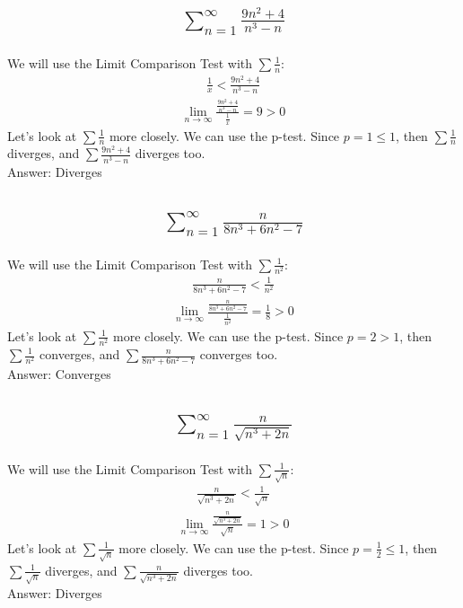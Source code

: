 \documentclass{article}
\begin{document}
\subsection{
	\begin{align*}
		\sum_{n = 1}^\infty \frac{9n^2 + 4}{n^3 - n}
	\end{align*}
}
We will use the Limit Comparison Test with $\sum \frac{1}{n}$:
\begin{align*}
	\frac{1}{x} < \frac{9n^2 + 4}{n^3 - n}
\end{align*}
\begin{align*}
	\lim_{n \to \infty} {\frac{\frac{9n^2 + 4}{n^3 - n}}{\frac{1}{x}}} = 9 > 0
\end{align*}
Let's look at $\sum \frac{1}{n}$ more closely. We can use the p-test. Since $p = 1 \leq 1$, then $\sum \frac{1}{n}$ diverges, and $\sum \frac{9n^2 + 4}{n^3 - n}$ diverges too. \\[10pt]
Answer: Diverges

\subsection{
	\begin{align*}
		\sum_{n = 1}^\infty \frac{n}{8n^3 + 6n^2 - 7}
	\end{align*}
}
We will use the Limit Comparison Test with $\sum \frac{1}{n^2}$:
\begin{align*}
	\frac{n}{8n^3 + 6n^2 - 7} < \frac{1}{n^2}
\end{align*}
\begin{align*}
	\lim_{n \to \infty} \frac{\frac{n}{8n^3 + 6n^2 - 7}}{\frac{1}{n^2}} = \frac{1}{8} > 0
\end{align*}
Let's look at $\sum \frac{1}{n^2}$ more closely. We can use the p-test. Since $p = 2 > 1$, then $\sum \frac{1}{n^2}$ converges, and $\sum \frac{n}{8n^3 + 6n^2 - 7}$ converges too. \\[10pt]
Answer: Converges

\subsection{
	\begin{align*}
		\sum_{n = 1}^\infty \frac{n}{\sqrt{n^3 + 2n}}
	\end{align*}
}
We will use the Limit Comparison Test with $\sum \frac{1}{\sqrt{n}}$:
\begin{align*}
	\frac{n}{\sqrt{n^3 + 2n}} < \frac{1}{\sqrt{n}}
\end{align*}
\begin{align*}
	\lim_{n \to \infty} \frac{\frac{n}{\sqrt{n^3 + 2n}}}{\sqrt{n}} = 1 > 0
\end{align*}
Let's look at $\sum \frac{1}{\sqrt{n}}$ more closely. We can use the p-test. Since $p = \frac{1}{2} \leq 1$, then $\sum \frac{1}{\sqrt{n}}$ diverges, and $\sum \frac{n}{\sqrt{n^3 + 2n}}$ diverges too. \\[10pt]
Answer: Diverges
\end{document}
